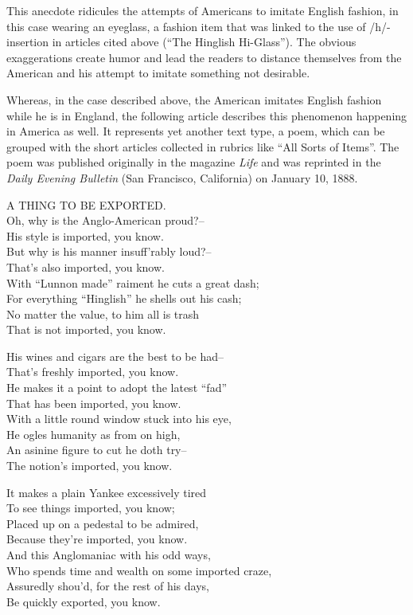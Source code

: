 This anecdote ridicules the attempts of Americans to imitate English fashion, in this case wearing an eyeglass, a fashion item that was linked to the use of /h/-insertion in articles cited above (“The Hinglish Hi-Glass”). The obvious exaggerations create humor and lead the readers to distance themselves from the American and his attempt to imitate something not desirable.


Whereas, in the case described above, the American imitates English fashion while he is in England, the following article describes this phenomenon happening in America as well. It represents yet another text type, a poem, which can be grouped with the short articles collected in rubrics like “All Sorts of Items”. The poem was published originally in the magazine \emph{Life} and was reprinted in the \emph{Daily Evening Bulletin} (San Francisco, California) on January 10, 1888.

\begin{ipquote}
A THING TO BE EXPORTED.\\
Oh, why is the Anglo-American proud?–\\
    His style is imported, you know.\\
But why is his manner insuff’rably loud?–\\
    That’s also imported, you know.\\
\newpage
With “Lunnon made” raiment he cuts a great dash;\\
For everything “Hinglish” he shells out his cash;\\
No matter the value, to him all is trash\\
    That is not imported, you know.


His wines and cigars are the best to be had–\\
    That’s freshly imported, you know.\\
He makes it a point to adopt the latest “fad”\\
    That has been imported, you know.\\
With a little round window stuck into his eye,\\
    He ogles humanity as from on high,\\
An asinine figure to cut he doth try–\\
    The notion’s imported, you know.


It makes a plain Yankee excessively tired\\
    To see things imported, you know;\\
Placed up on a pedestal to be admired,\\
    Because they’re imported, you know.\\
And this Anglomaniac with his odd ways,\\
Who spends time and wealth on some imported craze,\\
Assuredly shou’d, for the rest of his days,\\
    Be quickly exported, you know.\\
\end{ipquote}


